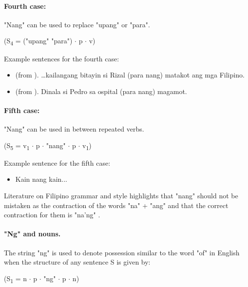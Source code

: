 \paragraph{Fourth case:} "Nang" can be used to replace "upang" or "para".
\begin{center}
      (S\textsubscript{4} = ("upang" {\textpipe} "para") \(\cdot\) p \(\cdot\) v)
\end{center}

\begin{example}
      Example sentences for the fourth case:
\end{example}
\begin{itemize}
      \item (from \cite{OOP}). …kailangang bitayin si Rizal (para {\textpipe} nang)
            matakot ang mga Filipino.
      \item (from \cite{OOP}). Dinala si Pedro sa ospital (para {\textpipe} nang)
            magamot.
\end{itemize}

\paragraph{Fifth case:} "Nang" can be used in between repeated verbs.
\begin{center}
      (S\textsubscript{5} = v\textsubscript{1} \(\cdot\) p \(\cdot\) "nang"
      \(\cdot\) p \(\cdot\) v\textsubscript{1})
\end{center}

\begin{example}
      Example sentence for the fifth case:
\end{example}
\begin{itemize}
      \item Kain nang kain...
\end{itemize}

Literature on Filipino grammar and style highlights that "nang" should not be
mistaken as the contraction of the words "na" + "ang" and that the correct
contraction for them is "na'ng" \cite{OOP}.

\paragraph{"Ng" and nouns.} The string "ng" is used to denote possession similar to
the word "of" in English when the structure of any sentence S is given by:

\begin{center}
      (S\textsubscript{1} = n \(\cdot\) p \(\cdot\) "ng" \(\cdot\) p \(\cdot\) n)
\end{center}

